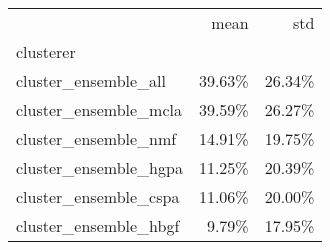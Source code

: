 \begin{tabular}{lrr}
\toprule
{} &   mean &    std \\
clusterer             &        &        \\
\midrule
cluster\_ensemble\_all  & 39.63\% & 26.34\% \\
cluster\_ensemble\_mcla & 39.59\% & 26.27\% \\
cluster\_ensemble\_nmf  & 14.91\% & 19.75\% \\
cluster\_ensemble\_hgpa & 11.25\% & 20.39\% \\
cluster\_ensemble\_cspa & 11.06\% & 20.00\% \\
cluster\_ensemble\_hbgf &  9.79\% & 17.95\% \\
\bottomrule
\end{tabular}

